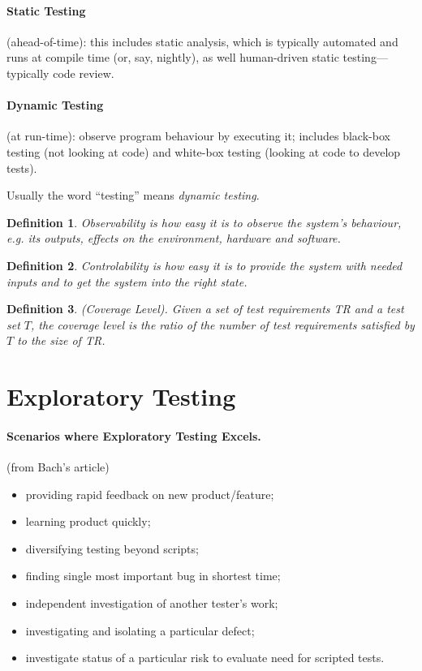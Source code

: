 \documentclass[11pt]{article}
\newtheorem{defn}{Definition}
\begin{document}
\paragraph{Static Testing} \hspace*{-1em} (ahead-of-time): this includes static analysis, which is typically automated and runs at compile time (or, say, nightly), as well human-driven static testing---typically code review.
\paragraph{Dynamic Testing}  \hspace*{-1em}  (at run-time): observe program behaviour by executing it; includes black-box testing (not looking at code) and white-box testing (looking at code to develop tests).

Usually the word ``testing'' means \emph{dynamic testing}.

\begin{defn}
\emph{Observability} is how easy it is to observe the system's behaviour, e.g.
its outputs, effects on the environment, hardware and software.
\end{defn}

\begin{defn}
\emph{Controlability} is how easy it is to provide the system with
needed inputs and to get the system into the right state.
\end{defn}

\begin{defn}
(Coverage Level). Given a set of test requirements TR and a test set $T$,
the coverage level is the ratio of the number of test requirements
satisfied by $T$ to the size of TR.
\end{defn}


\section*{Exploratory Testing}

\paragraph{Scenarios where Exploratory Testing Excels.} (from Bach's article)
\begin{itemize}[noitemsep]
\item providing rapid feedback on new product/feature;
\item learning product quickly;
\item diversifying testing beyond scripts;
\item finding single most important bug in shortest time;
\item independent investigation of another tester's work;
\item investigating and isolating a particular defect;
\item investigate status of a particular risk to evaluate need for scripted tests.
\end{itemize}
\end{document}
